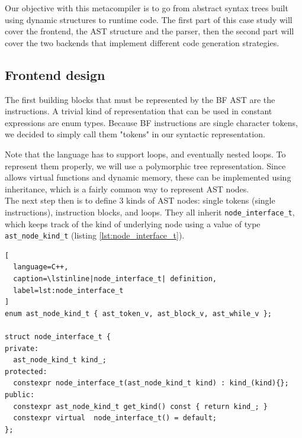 \documentclass[../../main.tex]{subfiles}
\begin{document}
Our objective with this metacompiler is to go from abstract syntax trees built
using \constexpr dynamic structures to runtime code. The first part of this case
study will cover the frontend, \ie the AST structure and the parser, then the
second part will cover the two backends that implement different code generation
strategies.


\subsection{Frontend design}

The first building blocks that must be represented by the BF AST are the
instructions. A trivial kind of representation that can be used in constant
expressions are enum types. Because BF instructions are single character tokens,
we decided to simply call them "tokens" in our syntactic representation.



Note that the language has to support loops, and eventually nested loops.
To represent them properly, we will use a polymorphic tree representation.
Since  allows virtual functions and dynamic memory, these can be
implemented using inheritance, which is a fairly common way to represent AST
nodes.\\

The next step then is to define 3 kinds of AST nodes: single tokens (\ie single
instructions), instruction blocks, and loops. They all inherit
\lstinline|node_interface_t|, which keeps track of the kind of underlying node
using a value of type \lstinline{ast_node_kind_t}
(listing \ref{lst:node_interface_t}).

\begin{lstlisting}[
  language=C++,
  caption=\lstinline|node_interface_t| definition,
  label=lst:node_interface_t
]
enum ast_node_kind_t { ast_token_v, ast_block_v, ast_while_v };

struct node_interface_t {
private:
  ast_node_kind_t kind_;
protected:
  constexpr node_interface_t(ast_node_kind_t kind) : kind_(kind){};
public:
  constexpr ast_node_kind_t get_kind() const { return kind_; }
  constexpr virtual  node_interface_t() = default;
};
\end{lstlisting}
\end{document}
